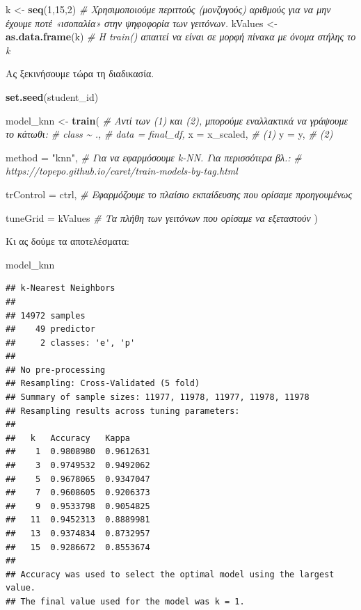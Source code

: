 \documentclass[
]{article}
\newenvironment{Shaded}{\begin{snugshade}}{\end{snugshade}}
\newcommand{\AttributeTok}[1]{\textcolor[rgb]{0.13,0.29,0.53}{#1}}
\newcommand{\CommentTok}[1]{\textcolor[rgb]{0.56,0.35,0.01}{\textit{#1}}}
\newcommand{\DecValTok}[1]{\textcolor[rgb]{0.00,0.00,0.81}{#1}}
\newcommand{\FunctionTok}[1]{\textcolor[rgb]{0.13,0.29,0.53}{\textbf{#1}}}
\newcommand{\NormalTok}[1]{#1}
\newcommand{\OtherTok}[1]{\textcolor[rgb]{0.56,0.35,0.01}{#1}}
\newcommand{\StringTok}[1]{\textcolor[rgb]{0.31,0.60,0.02}{#1}}
\begin{document}
\begin{Shaded}
\begin{Highlighting}[]
\NormalTok{k }\OtherTok{\textless{}{-}} \FunctionTok{seq}\NormalTok{(}\DecValTok{1}\NormalTok{,}\DecValTok{15}\NormalTok{,}\DecValTok{2}\NormalTok{) }\CommentTok{\# Χρησιμοποιούμε περιττούς (μονζυγούς) αριθμούς για να μην έχουμε ποτέ «ισοπαλία» στην ψηφοφορία των γειτόνων.}
\NormalTok{kValues }\OtherTok{\textless{}{-}} \FunctionTok{as.data.frame}\NormalTok{(k) }\CommentTok{\# Η train() απαιτεί να είναι σε μορφή πίνακα με όνομα στήλης το k}
\end{Highlighting}
\end{Shaded}

Ας ξεκινήσουμε τώρα τη διαδικασία.

\begin{Shaded}
\begin{Highlighting}[]
\FunctionTok{set.seed}\NormalTok{(student\_id) }

\NormalTok{model\_knn }\OtherTok{\textless{}{-}} \FunctionTok{train}\NormalTok{(}
  \CommentTok{\# Αντί των (1) και (2), μπορούμε εναλλακτικά να γράψουμε το κάτωθι:}
  \CommentTok{\# class \textasciitilde{} ., }
  \CommentTok{\# data = final\_df,}
  \AttributeTok{x =}\NormalTok{ x\_scaled,      }\CommentTok{\# (1)}
  \AttributeTok{y =}\NormalTok{ y,             }\CommentTok{\# (2)}
  
  \AttributeTok{method =} \StringTok{"knn"}\NormalTok{,    }\CommentTok{\# Για να εφαρμόσουμε k{-}NN. Για περισσότερα βλ.:}
  \CommentTok{\# https://topepo.github.io/caret/train{-}models{-}by{-}tag.html}
  
  \AttributeTok{trControl =}\NormalTok{ ctrl,  }\CommentTok{\# Εφαρμόζουμε το πλαίσιο εκπαίδευσης που ορίσαμε προηγουμένως}
  
  \AttributeTok{tuneGrid =}\NormalTok{ kValues }\CommentTok{\# Τα πλήθη των γειτόνων που ορίσαμε να εξεταστούν}
\NormalTok{)}
\end{Highlighting}
\end{Shaded}

Κι ας δούμε τα αποτελέσματα:

\begin{Shaded}
\begin{Highlighting}[]
\NormalTok{model\_knn}
\end{Highlighting}
\end{Shaded}

\begin{verbatim}
## k-Nearest Neighbors 
## 
## 14972 samples
##    49 predictor
##     2 classes: 'e', 'p' 
## 
## No pre-processing
## Resampling: Cross-Validated (5 fold) 
## Summary of sample sizes: 11977, 11978, 11977, 11978, 11978 
## Resampling results across tuning parameters:
## 
##   k   Accuracy   Kappa    
##    1  0.9808980  0.9612631
##    3  0.9749532  0.9492062
##    5  0.9678065  0.9347047
##    7  0.9608605  0.9206373
##    9  0.9533798  0.9054825
##   11  0.9452313  0.8889981
##   13  0.9374834  0.8732957
##   15  0.9286672  0.8553674
## 
## Accuracy was used to select the optimal model using the largest value.
## The final value used for the model was k = 1.
\end{verbatim}
\end{document}
